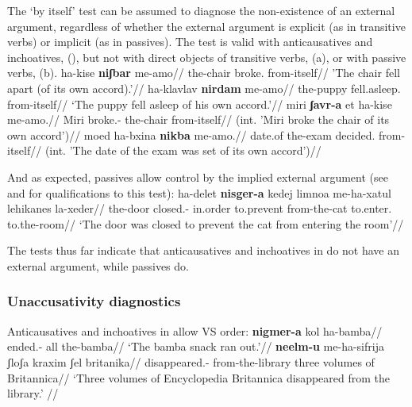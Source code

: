 The `by itself' test can be assumed to diagnose the non-existence of an external argument, regardless of whether the external argument is explicit (as in transitive verbs) or implicit (as in passives). The test is valid with anticausatives and inchoatives, (\nextx), but not with direct objects of transitive verbs, (\anextx a), or with passive verbs, (\anextx b).
\pex
	\a \begingl
		\gla ha-kise \textbf{niʃbar} me-a{\ts}mo//
	     \glb the-chair broke. from-itself//
	     \glft  'The chair fell apart (of its own accord).'//
    \endgl
	\a \begingl
		\gla ha-klavlav \textbf{nirdam} me-a{\ts}mo//
		\glb the-puppy fell.asleep. from-itself//
		\glft `The puppy fell asleep of his own accord.'//
	\endgl
\xe
\pex
    \a \ljudge{*} \begingl
	    \gla miri \textbf{ʃavr-a} et ha-kise me-a{\ts}mo.//
	    \glb Miri broke.-  the-chair from-itself//
	    \glft (int. 'Miri broke the chair of its own accord')//
    \endgl
    \a \ljudge{*} \begingl
	    \gla moed ha-bxina \textbf{nikba} me-a{\ts}mo.//
	    \glb date.of the-exam decided. from-itself//
	    \glft (int. 'The date of the exam was set of its own accord')//
   \endgl
\xe
    
And as expected, passives allow control by the implied external argument (see \citealt{williams15} and \citealt{bhattpancheva17} for qualifications to this test):
\ex \begingl
	\gla ha-delet \textbf{nisger-a} kedej limnoa me-ha-xatul lehikanes la-xeder//
	\glb the-door closed.- in.order to.prevent from-the-cat to.enter. to.the-room//
	\glft `The door was closed to prevent the cat from entering the room'//
	\endgl
\xe
    
The tests thus far indicate that anticausatives and inchoatives in {\tnif} do not have an external argument, while passives do.

	\subsubsection{Unaccusativity diagnostics} \label{vz:tnif:nact:unacc}
Anticausatives and inchoatives in {\tnif} allow VS order:
\pex 
	\a \begingl
		\gla \textbf{nigmer-a} kol ha-bamba//
		\glb ended.- all the-bamba//
		\glft `The bamba snack ran out.'//
		\endgl
	\a \begingl
		\gla \textbf{neelm-u} me-ha-sifrija ʃloʃa kraxim ʃel britanika//
		\glb disappeared.- from-the-library three volumes of Britannica//
		\glft `Three volumes of Encyclopedia Britannica disappeared from the library.' //
		\endgl
\xe

